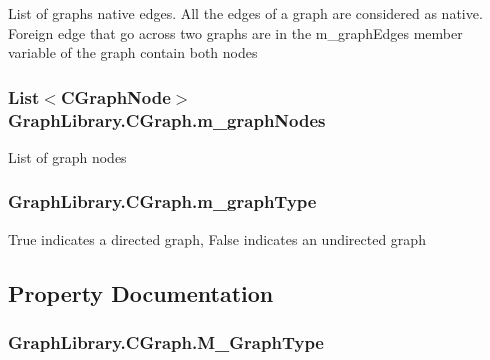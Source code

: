 List of graph\textquotesingle{}s native edges. All the edges of a graph are considered as native. Foreign edge that go across two graphs are in the m\+\_\+graph\+Edges member variable of the graph contain both nodes 

\hypertarget{class_graph_library_1_1_c_graph_abccc3feed7b02988f555743364ea4ea8}{}
\subsubsection[{m\+\_\+graph\+Nodes}]{\setlength{\rightskip}{0pt plus 5cm}List$<${\bf C\+Graph\+Node}$>$ Graph\+Library.\+C\+Graph.\+m\+\_\+graph\+Nodes\hspace{0.3cm}{\ttfamily [protected]}}\label{class_graph_library_1_1_c_graph_abccc3feed7b02988f555743364ea4ea8}


List of graph nodes 

\hypertarget{class_graph_library_1_1_c_graph_a5887f502837519c87dfb654748ee8fc7}{}
\subsubsection[{m\+\_\+graph\+Type}]{ Graph\+Library.\+C\+Graph.\+m\+\_\+graph\+Type\hspace{0.3cm}{\ttfamily [protected]}}\label{class_graph_library_1_1_c_graph_a5887f502837519c87dfb654748ee8fc7}


True indicates a directed graph, False indicates an undirected graph 



\subsection{Property Documentation}
\hypertarget{class_graph_library_1_1_c_graph_a705c73461dfec01d7ee91e8dc62d082f}{}
\subsubsection[{M\+\_\+\+Graph\+Type}]{ Graph\+Library.\+C\+Graph.\+M\+\_\+\+Graph\+Type\hspace{0.3cm}{\ttfamily [get]}}\label{class_graph_library_1_1_c_graph_a705c73461dfec01d7ee91e8dc62d082f}



